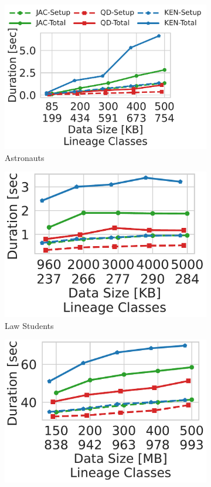 \begin{figure}[t]
    \begin{subfigure}{.35\textwidth}
      \centering
      \includegraphics[width=.87\linewidth]{figures/astr_size.pdf}
      \hspace{-0.51cm}
      \caption{Astronauts}
      \label{fig:r21}
    \end{subfigure}
    \begin{subfigure}{.35\textwidth}
      \centering
      \includegraphics[width=.75\linewidth]{figures/law_size.pdf}
      \caption{Law Students}
      \label{fig:r22}
    \end{subfigure}
    \begin{subfigure}{.35\textwidth}
      \centering
      \includegraphics[width=.75\linewidth]{figures/meps_size.pdf}

\end{subfigure}
\end{figure}
